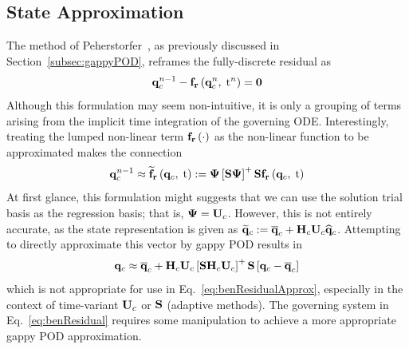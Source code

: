 \subsection{State Approximation}\label{subsec:stateApproxDEIM}
%
The method of Peherstorfer~\cite{Peherstorfer2020Adaptive}, as previously discussed in Section~\ref{subsec:gappyPOD}, reframes the fully-discrete residual as
%
\begin{equation}\label{eq:benResidualTwo}
	\mathbf{q}_{c}^{n-1} - \mathbf{f}_{\mathbf{r}}\left(\mathbf{q}_{c}^{n},\; \text{t}^{n}\right) = \mathbf{0}
\end{equation}
%
Although this formulation may seem non-intuitive, it is only a grouping of terms arising from the implicit time integration of the governing ODE. Interestingly, treating the lumped non-linear term $\mathbf{f}_{\mathbf{r}}\left(\cdot\right)$ as the non-linear function to be approximated makes the connection
%
\begin{equation}\label{eq:benResidualApprox}
	\consVec^{\timeIdx-1} \approx \rhsResApproxFunc{\consVec, \; \timeVar} \defEq \deimBasis \left[\sampMat \deimBasis \right]^+ \sampMat \rhsResFunc{\consVec, \; \timeVar}
\end{equation}
%
At first glance, this formulation might suggests that we can use the solution trial basis as the regression basis; that is, $\deimBasis = \consTrial$. However, this is not entirely accurate, as the state representation is given as $\consVecRom \defEq \consVecCent + \consScale \consTrial \consVecCoef$. Attempting to directly approximate this vector by gappy POD results in
%
\begin{equation}\label{eq:stateGPODWrong}
	\consVec \approx \consVecCent + \consScale \consTrial \left[\sampMat \consScale \consTrial\right]^+ \sampMat \left[\consVec - \consVecCent\right]
\end{equation}
%
which is not appropriate for use in Eq.~\ref{eq:benResidualApprox}, especially in the context of time-variant $\consTrial$ or $\mathbf{S}$ (adaptive methods). The governing system in Eq.~\ref{eq:benResidual} requires some manipulation to achieve a more appropriate gappy POD approximation.

